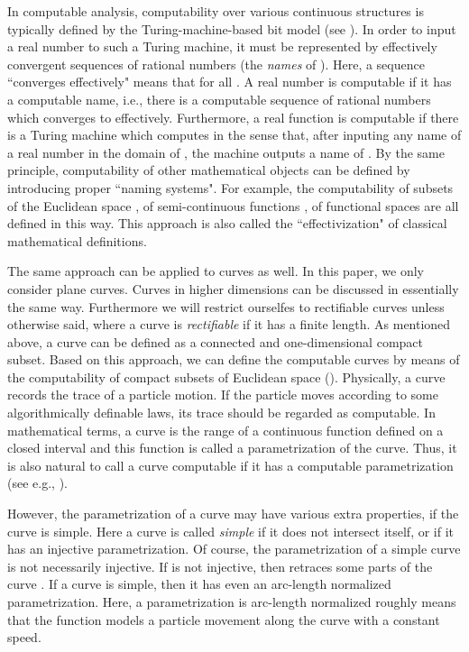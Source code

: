 \documentclass{LMCS}
\theoremstyle{plain}
\begin{document}
In computable analysis, computability over various continuous structures is typically defined by the Turing-machine-based bit model (see \cite{Ko91,Wei00,BC06}). In order to input a real number  to such a Turing machine, it must be represented by effectively convergent sequences of rational numbers (the {\em names} of ). Here, a sequence  ``converges effectively" means that  for all . A real number  is computable if it has a computable name, i.e., there is a computable sequence of rational numbers which converges to  effectively. Furthermore, a real function  is computable if there is a Turing machine which computes  in the sense that, after inputing any name of a real number  in the domain of , the machine outputs a name of . By the same principle, computability of other mathematical objects can be defined by introducing proper ``naming systems". For example, the computability of subsets of the Euclidean space \cite{BW99}, of semi-continuous functions \cite{WZ97}, of functional spaces \cite{ZW03} are all defined in this way. This approach is also called the ``effectivization" of classical mathematical definitions.

The same approach can be applied to curves as well. In this paper, we only consider plane curves. Curves in higher dimensions can be discussed in essentially the same way. Furthermore we will restrict ourselfes to rectifiable curves unless otherwise said, where a curve is {\em rectifiable} if it has a finite length.
As mentioned above, a curve can be defined as a connected and one-dimensional compact subset. Based on this approach, we can define the computable curves by means of the computability of compact subsets of Euclidean space (\cite{BW99}).  Physically, a curve records the trace of a particle motion. If the particle moves according to some algorithmically definable laws, its trace should be regarded as computable. In mathematical terms, a curve is the range of a continuous function defined on a closed interval and this function is called a parametrization of the curve. Thus, it is also natural to call a curve computable if it has a computable parametrization (see e.g.,  \cite{GLM06,GLM11}).

However, the parametrization of a curve may have various extra properties, if the curve is simple. Here a curve is called {\em simple} if it does not intersect itself, or if it has an injective parametrization. Of course, the parametrization  of a simple curve  is not necessarily injective. If  is not injective, then  retraces some parts of the curve . If a curve  is simple, then it has even an arc-length normalized parametrization. Here, a parametrization   is arc-length normalized roughly means that the function  models a particle movement along the curve  with a constant speed.
\end{document}

